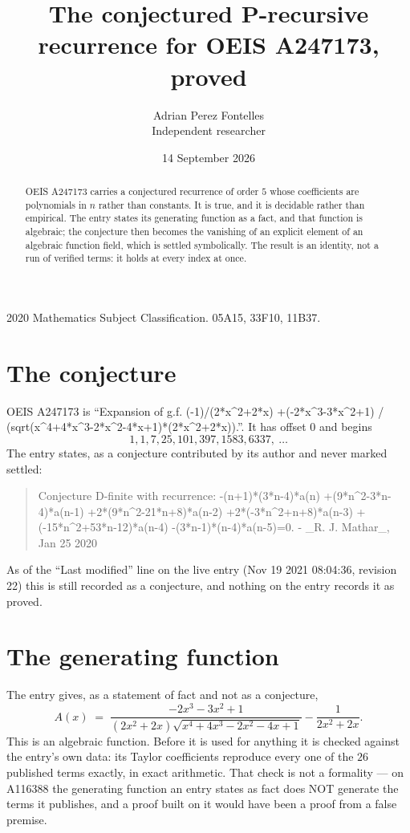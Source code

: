 \documentclass[11pt,a4paper]{article}
\title{The conjectured P-recursive recurrence for OEIS A247173, proved}
\author{Adrian Perez Fontelles\\ \small Independent researcher}
\date{14 September 2026}
\theoremstyle{plain}
\theoremstyle{definition}
\begin{document}
\maketitle

\begin{abstract}
OEIS A247173 carries a conjectured recurrence of order $5$ whose coefficients are polynomials in
$n$ rather than constants. It is true, and it is decidable rather than empirical. The entry
states its generating function as a fact, and that function is algebraic; the conjecture then
becomes the vanishing of an explicit element of an algebraic function field, which is settled
symbolically. The result is an identity, not a run of verified terms: it holds at every index
at once.
\end{abstract}

\noindent\small 2020 Mathematics Subject Classification. 05A15, 33F10, 11B37.\normalsize

\section{The conjecture}

OEIS A247173 is ``Expansion of g.f. (-1)/(2*x\^{}2+2*x) +(-2*x\^{}3-3*x\^{}2+1) / (sqrt(x\^{}4+4*x\^{}3-2*x\^{}2-4*x+1)*(2*x\^{}2+2*x)).''. It has offset $0$ and begins
\[
1, 1, 7, 25, 101, 397, 1583, 6337,\ \dots
\]
The entry states, as a conjecture contributed by its author and never marked settled:
\begin{quote}\raggedright\small
Conjecture D-finite with recurrence: -(n+1)*(3*n-4)*a(n) +(9*n\^{}2-3*n-4)*a(n-1) +2*(9*n\^{}2-21*n+8)*a(n-2) +2*(-3*n\^{}2+n+8)*a(n-3) +(-15*n\^{}2+53*n-12)*a(n-4) -(3*n-1)*(n-4)*a(n-5)=0. - \_R. J. Mathar\_, Jan 25 2020
\end{quote}
As of the ``Last modified'' line on the live entry (Nov 19 2021 08:04:36, revision 22)
this is still recorded as a conjecture, and nothing on the entry records it as proved.

\section{The generating function}

The entry gives, as a statement of fact and not as a conjecture,
\[
A(x)\;=\;\frac{- 2 x^{3} - 3 x^{2} + 1}{\left(2 x^{2} + 2 x\right) \sqrt{x^{4} + 4 x^{3} - 2 x^{2} - 4 x + 1}} - \frac{1}{2 x^{2} + 2 x} .
\]
This is an algebraic function. Before it is used for anything it is checked against the entry's
own data: its Taylor coefficients reproduce every one of the $26$ published terms
exactly, in exact arithmetic. That check is not a formality --- on A116388 the generating
function an entry states as fact does NOT generate the terms it publishes, and a proof built on
it would have been a proof from a false premise.
\end{document}
